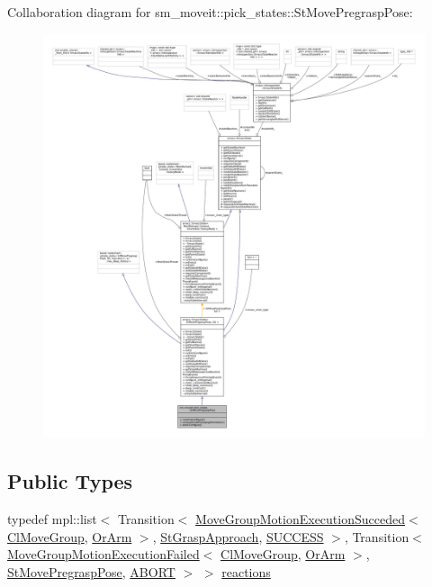 Collaboration diagram for sm\+\_\+moveit\+:\+:pick\+\_\+states\+:\+:St\+Move\+Pregrasp\+Pose\+:
\nopagebreak
\begin{figure}[H]
\begin{center}
\leavevmode
\includegraphics[width=350pt]{structsm__moveit_1_1pick__states_1_1StMovePregraspPose__coll__graph}
\end{center}
\end{figure}
\subsection*{Public Types}
\begin{DoxyCompactItemize}
\item 
typedef mpl\+::list$<$ Transition$<$ \hyperlink{structsm__moveit_1_1cl__movegroup_1_1MoveGroupMotionExecutionSucceded}{Move\+Group\+Motion\+Execution\+Succeded}$<$ \hyperlink{classsm__moveit_1_1cl__movegroup_1_1ClMoveGroup}{Cl\+Move\+Group}, \hyperlink{classsm__moveit_1_1OrArm}{Or\+Arm} $>$, \hyperlink{structsm__moveit_1_1pick__states_1_1StGraspApproach}{St\+Grasp\+Approach}, \hyperlink{classSUCCESS}{S\+U\+C\+C\+E\+SS} $>$, Transition$<$ \hyperlink{structsm__moveit_1_1cl__movegroup_1_1MoveGroupMotionExecutionFailed}{Move\+Group\+Motion\+Execution\+Failed}$<$ \hyperlink{classsm__moveit_1_1cl__movegroup_1_1ClMoveGroup}{Cl\+Move\+Group}, \hyperlink{classsm__moveit_1_1OrArm}{Or\+Arm} $>$, \hyperlink{structsm__moveit_1_1pick__states_1_1StMovePregraspPose}{St\+Move\+Pregrasp\+Pose}, \hyperlink{classABORT}{A\+B\+O\+RT} $>$ $>$ \hyperlink{structsm__moveit_1_1pick__states_1_1StMovePregraspPose_a24457ed9411566498ea50222265ad652}{reactions}
\end{DoxyCompactItemize}
